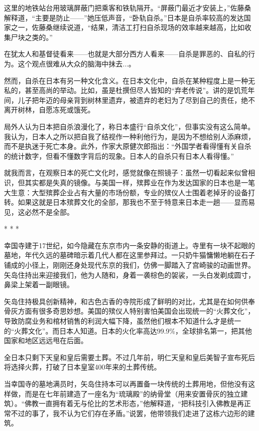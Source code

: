 \documentclass[12pt,oneside]{book}
\begin{document}
\begin{bookref}[frametitle={\cite{好好告别}}]
这里的地铁站台用玻璃屏蔽门把乘客和铁轨隔开。“屏蔽门最近才安装上，”佐藤桑解释道，“主要是防止——”她压低声音，“卧轨自杀。”日本是自杀率较高的发达国家之一，佐藤桑继续说道，“结果，清洁工打扫自杀现场的效率越来越高，比如收集尸块之类的。”

在犹太人和基督徒看来——也就是大部分西方人看来——自杀是罪恶的、自私的行为。这个观点很难从大众的脑海中抹去...。

然而，自杀在日本有另一种文化含义。在日本文化中，自杀在某种程度上是一种无私的，甚至高尚的举动。比如，虽是杜撰但尽人皆知的“弃老传说”。讲的是饥荒年间，儿子把年迈的母亲背到树林里遗弃，被遗弃的老妇为了尽到自己的责任，绝不离开树林，自愿冻死或饿死。

局外人认为日本把自杀浪漫化了，称日本盛行“自杀文化”，但事实没有这么简单。我认为，日本人之所以把自我了结视作一种利他行为，是因为不想给别人添麻烦，而不是执迷于死亡本身。此外，作家大原健次郎指出：“外国学者看得懂有关自杀的统计数字，但看不懂数字背后的现象。日本人的自杀只有日本人看得懂。”

就我而言，在观察日本的死亡文化时，感觉就像在照镜子：虽然一切看起来似曾相识，但其实都是失真的镜像。与美国一样，殡葬业在作为发达国家的日本也是一笔大生意：大型殡葬企业占有大量的市场份额，专业的殡仪人士围着老掉牙的设备打转。如果这就是日本殡葬文化的全部，那我也不至于特意来日本走一趟——显而易见，这必然不是全部。

\begin{center}
* * *
\end{center}

幸国寺建于17世纪，如今隐藏在东京市内一条安静的街道上。寺里有一块不起眼的墓地，年代久远的墓碑暗示着几代人都在这里参拜过。一只奶牛猫慵懒地躺在石子铺成的小径上，刚刚还身处现代东京的我们，仿佛一脚踏入了宫崎骏的动画世界。矢岛住持出来迎接我们，他为人随和，身着一袭棕色的袈裟，一头白发剃成圆寸，鼻梁上架着一副眼镜。

矢岛住持极具创新精神，和古色古香的寺院形成了鲜明的对比，尤其是在如何供奉骨灰方面有很多奇思妙想。美国的殡仪人特别害怕美国会出现统一的“火葬文化”，导致防腐业务和棺材销售的利润大幅下降，虽然他们根本不知道什么才是统一的“火葬文化”。而日本人知道。日本的火化率高达99.9\%，全球排名第一，把其他国家和地区远远甩在后面。

全日本只剩下天皇和皇后需要土葬。不过几年前，明仁天皇和皇后美智子宣布死后将选择火葬，打破了日本皇室400年来的土葬传统。

当幸国寺的墓地满员时，矢岛住持本可以再置备一块传统的土葬用地，但他没有这样做，而是在七年前建造了一座名为“琉璃殿”的纳骨堂（用来安置骨灰的独立建筑）。“佛教一直拥有着无与伦比的艺术形态，”他解释道，“把科技引入佛教是再正常不过的事了，我不认为它们存在矛盾。”说罢，他带领我们走进了这栋六边形的建筑。


\end{bookref}
\end{document}
